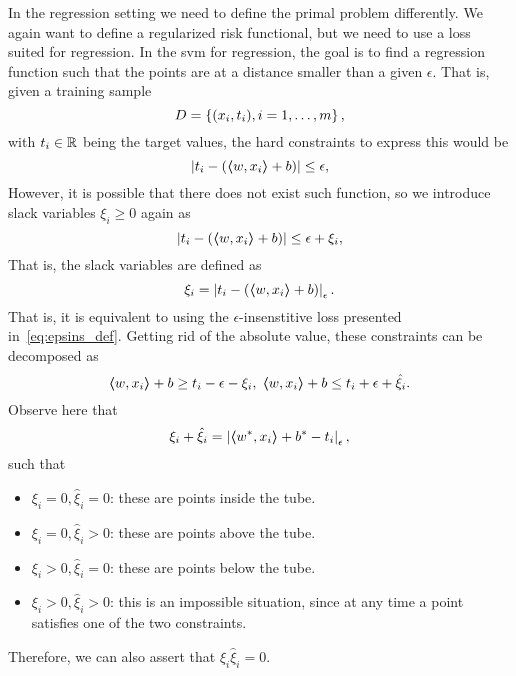In the regression setting we need to define the primal problem differently. We again want to define a regularized risk functional, but we need to use a loss suited for regression. In the \acrshort{svm} for regression, the goal is to find a regression function such that the points are at a distance smaller than a given $\epsilon$. 
%
That is, given a training sample 
$$ D = \left\{(x_i, t_i), i=1, \ldots, m\right\}, $$
with $t_i \in \mathbb{R}$ being the target values, the hard constraints to express this would be 
\begin{equation}
    \nonumber
    \left|t_i - (\bm{\left\langle} w, x_i \bm{\right\rangle} + b) \right| \leq \epsilon,
\end{equation}
However, it is possible that there does not exist such function, so we introduce slack variables $\xi_i \geq 0$ again as
\begin{equation}
    \nonumber
    \left|t_i - (\bm{\left\langle} w, x_i \bm{\right\rangle} + b) \right| \leq \epsilon + \xi_i,
\end{equation}
That is, the slack variables are defined as 
\begin{equation}
    \xi_i = \left|t_i - (\bm{\left\langle} w, x_i \bm{\right\rangle} + b)\right|_\epsilon .
\end{equation}
That is, it is equivalent to using the $\epsilon$-insenstitive loss presented in~\eqref{eq:epsins_def}.
Getting rid of the absolute value, these constraints can be decomposed as
\begin{equation}
    \nonumber
   \bm{\left\langle} w, x_i \bm{\right\rangle} + b \geq t_i - \epsilon - \xi_i , \; \bm{\left\langle} w, x_i \bm{\right\rangle} + b \leq t_i + \epsilon + \hat{\xi}_i.
\end{equation}
Observe here that $$ \xi_i + \hat{\xi}_i = \left|\bm{\left\langle} {w}^*, x_i \bm{\right\rangle} + {b}^* - t_i\right|_\epsilon ,$$
such that
\begin{itemize}
    \item $\xi_i = 0, \hat{\xi}_i = 0$: these are points inside the tube.
    \item $\xi_i = 0, \hat{\xi}_i > 0$: these are points above the tube.
    \item $\xi_i > 0, \hat{\xi}_i = 0$: these are points below the tube.
    \item $\xi_i > 0, \hat{\xi}_i > 0$: this is an impossible situation, since at any time a point satisfies one of the two constraints.
\end{itemize}
Therefore, we can also assert that $\xi_i \hat{\xi}_i = 0$.

